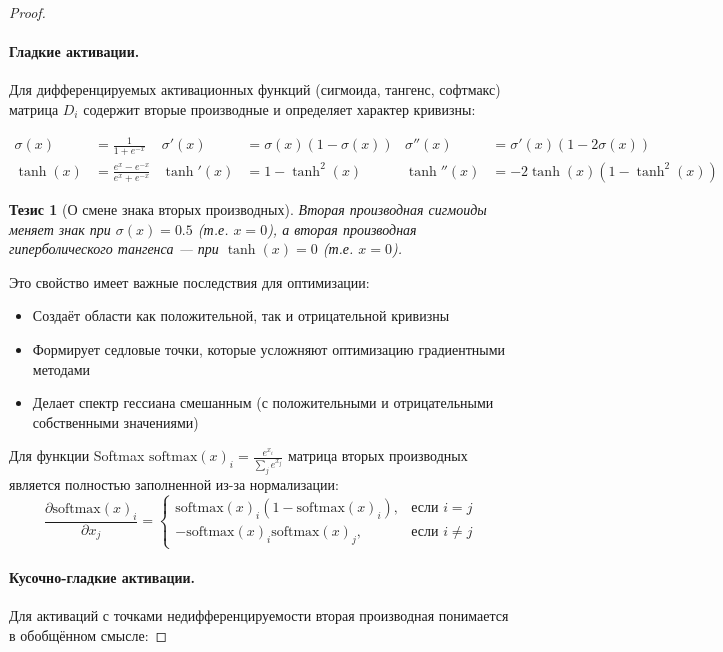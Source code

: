 \documentclass[a4paper,12pt]{article}
\newtheorem{proposition}{Тезис}
\begin{document}
\begin{proof}
    \paragraph{Гладкие активации.} 
    Для дифференцируемых активационных функций (сигмоида, тангенс, софтмакс) матрица $D_i$ содержит вторые производные и определяет характер кривизны:
    
    \begin{align}
    \sigma(x) &= \frac{1}{1+e^{-x}} &\sigma'(x) &= \sigma(x)(1-\sigma(x)) &\sigma''(x) &= \sigma'(x)(1-2\sigma(x)) \\
    \tanh(x) &= \frac{e^x - e^{-x}}{e^x + e^{-x}} &\tanh'(x) &= 1 - \tanh^2(x) &\tanh''(x) &= -2\tanh(x)(1-\tanh^2(x))
    \end{align}
    
    \begin{proposition}[О смене знака вторых производных]
    Вторая производная сигмоиды меняет знак при $\sigma(x) = 0.5$ (т.е. $x = 0$), а вторая производная гиперболического тангенса — при $\tanh(x) = 0$ (т.е. $x = 0$).
    \end{proposition}
    
    Это свойство имеет важные последствия для оптимизации:
    \begin{itemize}
    \item Создаёт области как положительной, так и отрицательной кривизны
    \item Формирует седловые точки, которые усложняют оптимизацию градиентными методами
    \item Делает спектр гессиана смешанным (с положительными и отрицательными собственными значениями)
    \end{itemize}
    
    Для функции Softmax $\text{softmax}(x)_i = \frac{e^{x_i}}{\sum_{j} e^{x_j}}$ матрица вторых производных является полностью заполненной из-за нормализации:
    \begin{equation}
    \frac{\partial \text{softmax}(x)_i}{\partial x_j} = 
    \begin{cases}
    \text{softmax}(x)_i (1 - \text{softmax}(x)_i), & \text{если } i = j \\
    -\text{softmax}(x)_i \text{softmax}(x)_j, & \text{если } i \neq j
    \end{cases}
    \end{equation}
    
    \paragraph{Кусочно-гладкие активации.}
    Для активаций с точками недифференцируемости вторая производная понимается в обобщённом смысле:
    

\end{proof}
\end{document}
